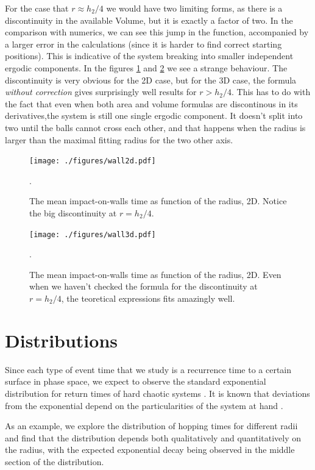 \documentclass[superscriptaddress,pre,reprint,showpacs,twocolumn]{revtex4-1}
\begin{document}
For the case that $r\approx h_2/4$ we would have two limiting forms,
as there is a discontinuity in the available Volume, but it is exactly
a factor of two. In the comparison with numerics, we can see
this jump in the function, accompanied by a larger error in the
calculations (since it is harder to find correct starting positions). 
This is indicative of 
the system breaking into smaller independent ergodic components.
In the figures \ref{wall2d} and \ref{wall3d} we see a strange
behaviour. The discontinuity is very obvious for the 2D case,
but for the 3D case, the formula \emph{without correction}
gives surprisingly well results for $r > h_2/4$. This has to
do with the fact that even when both area and volume
formulas are discontinous in its derivatives,the system is still
one single ergodic component. It doesn't split into two until
the balls cannot cross each other, and that happens when
the radius is larger than the maximal fitting radius for
the two other axis. 

\begin{figure}[h]
  \centering
  \texttt{[image: ./figures/wall2d.pdf]}
  \caption{The mean impact-on-walls time as function of the radius, 2D.
    Notice the big discontinuity at $r=h_2/4$.}
    \label{wall2d}.
\end{figure}


\begin{figure}[h]
  \centering
  \texttt{[image: ./figures/wall3d.pdf]}
  \caption{The mean impact-on-walls time as function of the radius, 2D.
    Even when we haven't checked the formula for
    the discontinuity at $r=h_2/4$, the teoretical expressions fits
    amazingly well.}
    \label{wall3d}.
\end{figure}


%
\section{Distributions}

Since each type of event time that we study is a recurrence time to a
certain surface in phase space, we expect to observe the standard
exponential distribution for return times of hard chaotic systems
\cite{Hirata1999}. It is known that deviations from the
exponential depend on the particularities of the system at hand
\cite{Altmann2005}.


As an example, we explore
the distribution of hopping times for different radii and find that the
distribution depends both qualitatively and quantitatively on the
radius, with the expected exponential decay being observed in the middle section
of the distribution. 
\end{document}
